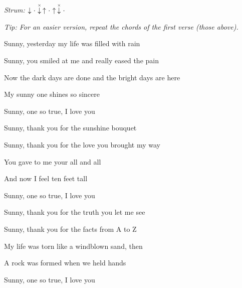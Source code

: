 \begin{song}


\begin{strumbox}
\textit{Strum:} $\Down\Miss\ChuckDown\Up\Miss\Up\ChuckDown\Miss$
\end{strumbox}

\begin{hchordbox}
\hspace{-2em} %
\end{hchordbox}

\large

\bigskip

{
\smaller \it Tip: For an easier version, repeat the chords of the first verse (those above).
}

\fontsize{11}{13.6}\selectfont

\bigskip

Sunny,  yesterday my life was filled with rain  \par
{}Sunny,  you smiled at me and  really eased the pain  \par
Now the dark days are done and the bright days are here \par
{}My sunny one shines so sincere \par
{}Sunny, one so true, I love you \par

\bigskip

Sunny,  thank you for the sunshine bouquet  \par
{}Sunny,  thank you for the love you brought my way  \par
You gave to me your all and all \par
And now I feel ten feet tall \par
{}Sunny, one so true, I love you  \par

\bigskip

Sunny,  thank you for the truth you let me see  \par
{}Sunny,  thank you for the facts from A to Z  \par
{}My life was torn like a windblown sand, then \par
{}A rock was formed when we held hands \par
{}Sunny, one so true, I love you  \par


\end{song}
